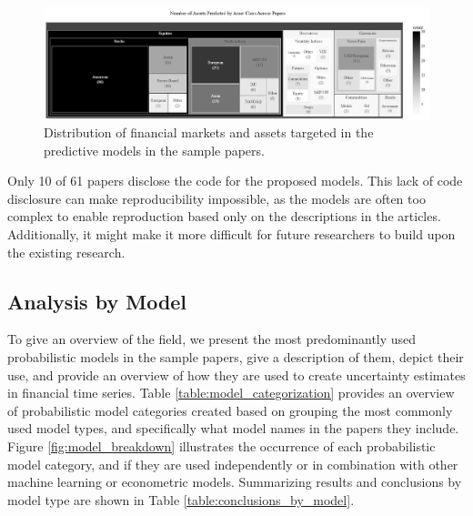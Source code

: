 \begin{figure}[h]
    \centering
    \includegraphics[width=1\linewidth]{Images/treemap_asset_by_market.png}
    \caption{Distribution of financial markets and assets targeted in the predictive models in the sample papers. }
    \label{fig:treemap_asset_by_market}
\end{figure}

Only 10 of 61 papers disclose the code for the proposed models. This lack of code disclosure can make reproducibility impossible, as the models are often too complex to enable reproduction based only on the descriptions in the articles. Additionally, it might make it more difficult for future researchers to build upon the existing research.





\subsection{Analysis by Model}
\label{sec:analysis_by_model}
To give an overview of the field, we present the most predominantly used probabilistic models in the sample papers, give a description of them, depict their use, and provide an overview of how they are used to create uncertainty estimates in financial time series. Table \ref{table:model_categorization} provides an overview of probabilistic model categories created based on grouping the most commonly used model types, and specifically what model names in the papers they include. Figure \ref{fig:model_breakdown} illustrates the occurrence of each probabilistic model category, and if they are used independently or in combination with other machine learning or econometric models. Summarizing results and conclusions by model type are shown in Table \ref{table:conclusions_by_model}.

